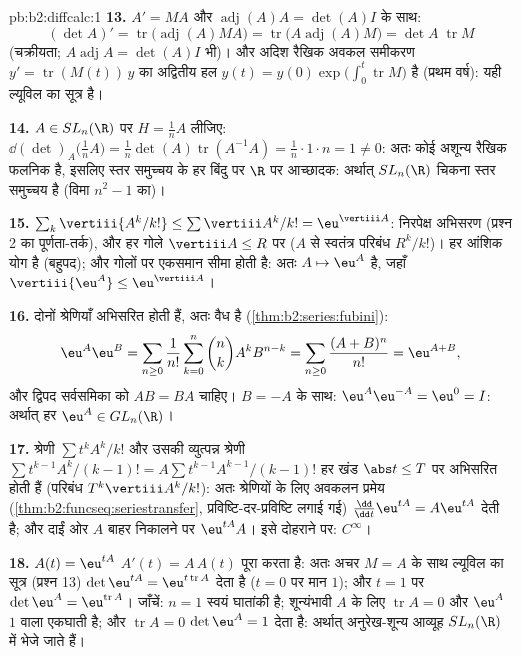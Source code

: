 \begin{solution}{pb:b2:diffcalc:1}
\textbf{13.} $A' = MA$ और $\operatorname{adj}(A)A = \det(A)I$ के साथ:
\[
(\det A)' = \operatorname{tr}\bigl(\operatorname{adj}(A)MA
\bigr)
= \operatorname{tr}\bigl(A\operatorname{adj}(A)M\bigr)
= \det A\;\operatorname{tr}M
\]
(चक्रीयता; $A\operatorname{adj}A = \det(A) I$ भी)। और अदिश रैखिक अवकल समीकरण $y' = \operatorname{tr}(M(t))\,y$ का अद्वितीय हल $y(t) = y(0)\exp\bigl(\int_0^t
\operatorname{tr}M\bigr)$ है
(प्रथम वर्ष): यही ल्यूविल का सूत्र है।

\textbf{14.} $A \in SL_n(\R)$ पर $H = \frac1nA$ लीजिए: $\dd(\det)_A\bigl(\tfrac1nA\bigr) = \frac1n\det(A)
\operatorname{tr}(A^{-1}A) = \frac1n\cdot1\cdot n = 1 \neq 0$: अतः  कोई अशून्य रैखिक फलनिक है,
इसलिए स्तर समुच्चय के हर बिंदु पर $\R$ पर आच्छादक: अर्थात् $SL_n(\R)$ चिकना स्तर
समुच्चय है (विमा $n^2 - 1$ का)।

\textbf{15.} $\sum_k\vertiii{A^k/k!} \leq
\sum\vertiii A^k/k! = \eu^{\vertiii A}$: निरपेक्ष अभिसरण (प्रश्न 2 का पूर्णता-तर्क), और हर गोले
$\vertiii A \leq R$ पर  ($A$ से स्वतंत्र परिबंध $R^k/k!$)। हर आंशिक योग  है
(बहुपद); और गोलों पर एकसमान सीमा  होती है: अतः $A \mapsto \eu^A$  है, जहाँ $\vertiii{\eu^A} \leq \eu^{\vertiii A}$।

\textbf{16.} दोनों श्रेणियाँ  अभिसरित होती हैं, अतः  वैध है (\cref{thm:b2:series:fubini}):
\[
\eu^A\eu^B = \sum_{n\geq0}\frac{1}{n!}\sum_{k=0}^n\binom
nkA^kB^{n-k}
= \sum_{n\geq0}\frac{(A+B)^n}{n!} = \eu^{A+B},
\]
और द्विपद सर्वसमिका को $AB = BA$ चाहिए। $B = -A$ के साथ: $\eu^A\eu^{-A} = \eu^0 = I$: अर्थात् हर $\eu^A \in GL_n(\R)$।

\textbf{17.} श्रेणी $\sum t^kA^k/k!$ और उसकी व्युत्पन्न श्रेणी $\sum t^{k-1}A^k/(k-1)! = A\sum t^{k-1}A^{k-1}/(k-1)!$ हर खंड $\abs t \leq T$ पर
 अभिसरित होती हैं (परिबंध $T^k\vertiii A^k/k!$): अतः श्रेणियों के लिए अवकलन
प्रमेय (\cref{thm:b2:funcseq:seriestransfer}, प्रविष्टि-दर-प्रविष्टि लगाई गई) $\frac{\dd}{\dd t}\eu^{tA} = A\eu^{tA}$ देती है; और दाईं ओर $A$
बाहर निकालने पर $\eu^{tA}A$। इसे दोहराने पर: $C^\infty$।

\textbf{18.} $A(t) = \eu^{tA}$ $A'(t) = A\,A(t)$ पूरा करता है: अतः अचर $M = A$ के साथ ल्यूविल का सूत्र
(प्रश्न 13) $\det\eu^{tA} = \eu^{t\operatorname{tr}A}$ देता है ($t =
0$ पर मान $1$); और $t = 1$ पर $\det\eu^A = \eu^{\operatorname{tr}A}$। जाँचें: $n = 1$
स्वयं घातांकी है; शून्यंभावी $A$ के लिए $\operatorname{tr}A = 0$ और $\eu^A$  $1$ वाला
एकघाती है; और $\operatorname{tr}A = 0$ $\det\eu^A = 1$ देता है: अर्थात् अनुरेख-शून्य आव्यूह $SL_n(\R)$ में
भेजे जाते हैं।


\end{solution}
